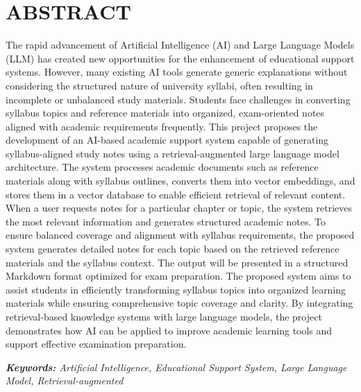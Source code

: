 \chapter*{ABSTRACT}

The rapid advancement of Artificial Intelligence (AI) and Large Language Models (LLM) has created new opportunities for the enhancement of educational support systems. However, many existing AI tools generate generic explanations without considering the structured nature of university syllabi, often resulting in incomplete or unbalanced study materials. Students face challenges in converting syllabus topics and reference materials into organized, exam-oriented notes aligned with academic requirements frequently. This project proposes the development of an AI-based academic support system capable of generating syllabus-aligned study notes using a retrieval-augmented large language model architecture. The system processes academic documents such as reference materials along with syllabus outlines, converts them into vector embeddings, and stores them in a vector database to enable efficient retrieval of relevant content. When a user requests notes for a particular chapter or topic, the system retrieves the most relevant information and generates structured academic notes. To ensure balanced coverage and alignment with syllabus requirements, the proposed system generates detailed notes for each topic based on the retrieved reference materials and the syllabus context. The output will be presented in a structured Markdown format optimized for exam preparation. The proposed system aims to assist students in efficiently transforming syllabus topics into organized learning materials while ensuring comprehensive topic coverage and clarity. By integrating retrieval-based knowledge systems with large language models, the project demonstrates how AI can be applied to improve academic learning tools and support effective examination preparation. \par

\vspace{1cm}

\textit{\textbf{Keywords:} Artificial Intelligence, Educational Support System, Large Language Model, Retrieval-augmented }